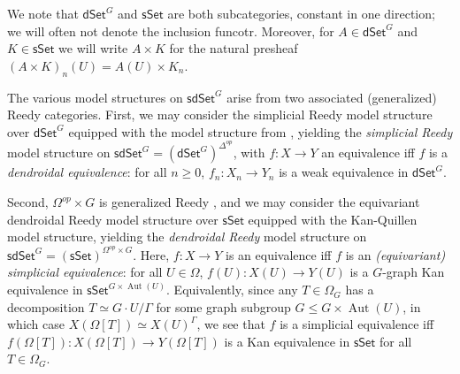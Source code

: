 \documentclass[a4paper,10pt
,draft
]{article}%
\numberwithin{equation}{section}
\numberwithin{figure}{section}
\theoremstyle{definition} %
\newcommand{\sSet}{\ensuremath{\mathsf{sSet}}}%
\newcommand{\dSet}{\mathsf{dSet}}
\DeclareMathOperator{\Aut}{Aut}%
\newcommand{\1}{\ensuremath{\mathbbm 1}}%
\begin{document}
We note that $\dSet^G$ and $\sSet$ are both subcategories, constant in one direction;
we will often not denote the inclusion funcotr.
Moreover, for $A \in \dSet^G$ and $K \in \sSet$ we will write $A \times K$ for the natural presheaf $(A \times K)_n(U) = A(U) \times K_n$.

The various model structures on $\mathsf{sdSet}^G$ arise from two associated (generalized) Reedy categories.
First, we may consider the simplicial Reedy model structure over $\dSet^G$ equipped with the model structure from \cite{Per18},
yielding the \textit{simplicial Reedy} model structure on $\mathsf{sdSet}^G = (\dSet^G)^{\Delta^{op}}$,
with $f \colon X \to Y$ an equivalence iff $f$ is a \textit{dendroidal equivalence}: for all $n \geq 0$, $f_n: X_n \to Y_n$ is a weak equivalence in $\dSet^G$.

Second, $\Omega^{op} \times G$ is generalized Reedy \cite[Example A.7]{BP_edss},
and we may consider the equivariant dendroidal Reedy model structure over $\sSet$ equipped with the Kan-Quillen model structure,
yielding the \textit{dendroidal Reedy} model structure on $\mathsf{sdSet}^G = (\sSet)^{\Omega^{op} \times G}$.
Here, $f\colon X \to Y$ is an equivalence iff $f$ is an \textit{(equivariant) simplicial equivalence}:
for all $U \in \Omega$, $f(U) \colon X(U) \to Y(U)$ is a $G$-graph Kan equivalence in $\sSet^{G \times \Aut(U)}$.
Equivalently, since any $T \in \Omega_G$ has a decomposition $T \simeq G \cdot U/\Gamma$ for some graph subgroup $G \leq G \times \Aut(U)$,
in which case $X(\Omega[T]) \simeq X(U)^\Gamma$,
we see that $f$ is a simplicial equivalence iff $f(\Omega[T]) \colon X(\Omega[T]) \to Y(\Omega[T])$ is a Kan equivalence in $\sSet$ for all $T \in \Omega_G$.
\end{document}
